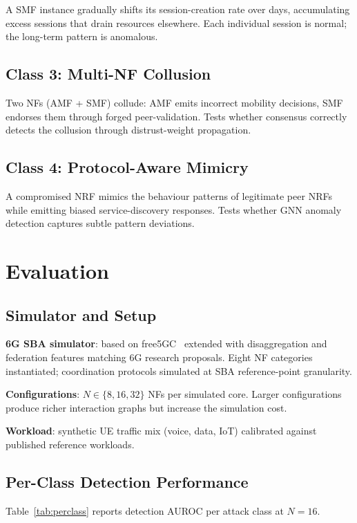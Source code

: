 \documentclass[sigconf,nonacm]{acmart}
\begin{document}
A SMF instance gradually shifts its session-creation rate over
days, accumulating excess sessions that drain resources elsewhere.
Each individual session is normal; the long-term pattern is
anomalous.

\subsection{Class 3: Multi-NF Collusion}

Two NFs (AMF + SMF) collude: AMF emits incorrect mobility
decisions, SMF endorses them through forged peer-validation.
Tests whether consensus correctly detects the collusion through
distrust-weight propagation.

\subsection{Class 4: Protocol-Aware Mimicry}

A compromised NRF mimics the behaviour patterns of legitimate
peer NRFs while emitting biased service-discovery responses.
Tests whether GNN anomaly detection captures subtle pattern
deviations.

\section{Evaluation}

\subsection{Simulator and Setup}

\textbf{6G SBA simulator}: based on
free5GC~\cite{free5gc2024} extended with disaggregation and
federation features matching 6G research proposals. Eight NF
categories instantiated; coordination protocols simulated at
SBA reference-point granularity.

\textbf{Configurations}: $N \in \{8, 16, 32\}$ NFs per simulated
core. Larger configurations produce richer interaction graphs but
increase the simulation cost.

\textbf{Workload}: synthetic UE traffic mix (voice, data, IoT)
calibrated against published reference workloads.

\subsection{Per-Class Detection Performance}

Table~\ref{tab:perclass} reports detection AUROC per attack class
at $N=16$.
\end{document}
